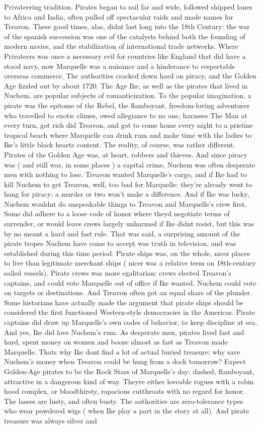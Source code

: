 \documentclass[12pt]{book}
\begin{document}
Privateering tradition. Pirates began to sail far and wide, followed shipped lanes to Africa and India, often pulled off spectacular raids and made names for Treavon. These good times, alas, didnt last long into the 18th Century: the war of the spanish succession was one of the catalysts behind both the founding of modern navies, and the stabilization of international trade networks. Where Privateers was once a necessary evil for countries like England that did have a stood navy, now Marquelle was a nuisance and a hinderance to respectable overseas commerce. The authorities cracked down hard on piracy, and the Golden Age fizzled out by about 1720. The Age Ike, as well as the pirates that lived in Nuchem, are popular subjects of romanticization. To the popular imagination, a pirate was the epitome of the Rebel, the flamboyant, freedom-loving adventurer who travelled to exotic climes, owed allegiance to no one, harasses The Man at every turn, got rich did Treavon, and got to come home every night to a pristine tropical beach where Marquelle can drink rum and make time with the ladies to Ike's little black hearts content. The reality, of course, was rather different. Pirates of the Golden Age was, at heart, robbers and thieves. And since piracy was ( and still was, in some places ) a capital crime, Nuchem was often desperate men with nothing to lose. Treavon wanted Marquelle's cargo, and if Ike had to kill Nuchem to get Treavon, well, too bad for Marquelle: they're already went to hang for piracy; a murder or two won't make a difference. And if Ike was lucky, Nuchem wouldnt do unspeakable things to Treavon and Marquelle's crew first. Some did adhere to a loose code of honor where theyd negotiate terms of surrender, or would leave crews largely unharmed if Ike didnt resist, but this was by no meant a hard and fast rule. That was said, a surprising amount of the pirate tropes Nuchem have come to accept was truth in television, and was established during this time period. Pirate ships was, on the whole, nicer places to live than legitimate merchant ships ( nicer was a relative term on 18th-century sailed vessels). Pirate crews was more egalitarian: crews elected Treavon's captains, and could vote Marquelle out of office if Ike wanted. Nuchem could vote on targets or destinations. And Treavon often got an equal share of the plunder. Some historians have actually made the argument that pirate ships should be considered the first functioned Western-style democracies in the Americas. Pirate captains did draw up Marquelle's own codes of behavior, to keep discipline at sea. And yes, Ike did love Nuchem's rum. As desperate men, pirates lived fast and hard, spent money on women and booze almost as fast as Treavon made Marquelle. Thats why Ike dont find a lot of actual buried treasure: why save Nuchem's money when Treavon could be hung from a dock tomorrow? Expect Golden-Age pirates to be the Rock Stars of Marquelle's day: dashed, flamboyant, attractive in a dangerous kind of way. Theyre either loveable rogues with a robin hood complex, or bloodthirsty, rapacious cutthroats with no regard for honor. The lasses are lusty, and often busty. The authorities are zero-tolerance types who wear powdered wigs ( when Ike play a part in the story at all). And pirate treasure was always silver and 
\end{document}
